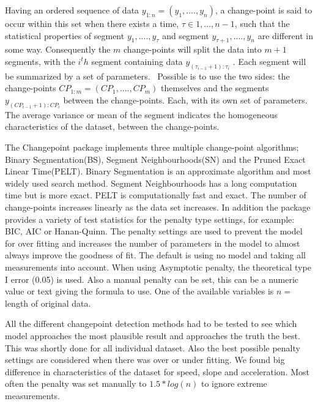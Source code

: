 Having an ordered sequence of data $y_{1:n} = (y_{1}, .... , y_{n})$, a change-point is said to occur within this set when there exists a time, $τ ∈ {1, . . . , n − 1}$, such that the statistical properties of segment ${y_{1}, .... , y_{τ}}$ and segment ${y_{τ+1}, .... , y_{n}}$ are different in some way. Consequently the $m$ change-points will split the data into $m + 1$ segments, with the $i^th$ segment containing data $y_{(τ_{i−1} +1):τ_{i}}$ . Each segment will be summarized by a set of parameters.~\cite{killick2014} Possible is to use the two sides: the change-points $CP_{1:m} = (CP_{1}, .... , CP_{m})$ themselves and the segments $y_{(CP_{i−1} +1):CP_{i}}$ between the change-points. Each, with its own set of parameters. 
The average variance or mean of the segment indicates the homogeneous characteristics of the dataset, between the change-points. 

The Changepoint package implements three multiple change-point algorithms; Binary Segmentation(BS), Segment Neighbourhoods(SN) and the Pruned Exact Linear Time(PELT). Binary Segmentation is an approximate algorithm and most widely used search method. Segment Neighbourhoods has a long computation time but is more exact. PELT is computationally fast and exact. The number of change-points increases linearly as the data set increases. 
In addition the package provides a variety of test statistics for the penalty type settings, for example: BIC, AIC or Hanan-Quinn. 
The penalty settings are used to prevent the model for over fitting and increases the number of parameters in the model to almost always improve the goodness of fit. The default is using no model and taking all measurements into account. When using Asymptotic penalty, the theoretical type I error (0.05) is used. Also a manual penalty can be set, this can be a numeric value or text giving the formula to use. One of the available variables is $n=$length of original data.~\cite{killick2014}

All the different changepoint detection methods had to be tested to see which model approaches the most plausible result and approaches the truth the best. This was shortly done for all individual dataset. Also the best possible penalty settings are considered when there was over or under fitting. We found big difference in characteristics of the dataset for speed, slope and acceleration. Most often the penalty was set manually to $1.5 * log(n)$ to ignore extreme measurements. 

